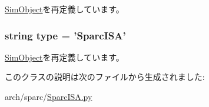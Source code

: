 \hyperlink{classm5_1_1SimObject_1_1SimObject_a17da7064bc5c518791f0c891eff05fda}{SimObject}を再定義しています。\hypertarget{classSparcISA_1_1SparcISA_acce15679d830831b0bbe8ebc2a60b2ca}{
\subsubsection[{type}]{\setlength{\rightskip}{0pt plus 5cm}string {\bf type} = '{\bf SparcISA}'}}
\label{classSparcISA_1_1SparcISA_acce15679d830831b0bbe8ebc2a60b2ca}


\hyperlink{classm5_1_1SimObject_1_1SimObject_acce15679d830831b0bbe8ebc2a60b2ca}{SimObject}を再定義しています。

このクラスの説明は次のファイルから生成されました:\begin{DoxyCompactItemize}
\item 
arch/sparc/\hyperlink{SparcISA_8py}{SparcISA.py}\end{DoxyCompactItemize}
